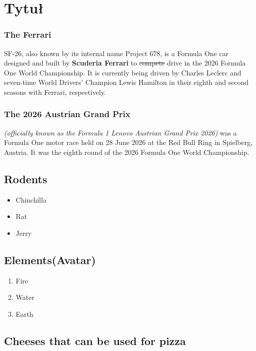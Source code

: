 \documentclass[11pt,a4paper]{article}
\begin{document}
\section{Tytuł}

\subsubsection{The Ferrari}

SF-26, also known by its internal name Project 678, is a Formula One car designed and built by \textbf{Scuderia Ferrari} to \sout{compete} drive in the 2026 Formula One World Championship. It is currently being driven by Charles Leclerc and seven-time World Drivers' Champion Lewis Hamilton in their eighth and second seasons with Ferrari, respectively.

\subsubsection{The 2026 Austrian Grand Prix}

\textit{(officially known as the Formula 1 Lenovo Austrian Grand Prix 2026)} was a Formula One motor race held on 28 June 2026 at the Red Bull Ring in Spielberg, Austria. It was the eighth round of the 2026 Formula One World Championship.

\subsection{Rodents}

\begin{itemize}
  \item Chinchilla
  \item Rat
  \item Jerry
\end{itemize}

\subsection{Elements(Avatar)}

\begin{enumerate}
  \item Fire
  \item Water
  \item Earth
\end{enumerate}

\subsection{Cheeses that can be used for pizza}
\end{document}
